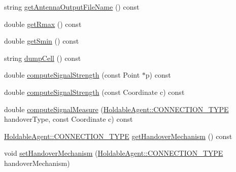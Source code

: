 \begin{DoxyCompactItemize}
\item 
string \mbox{\hyperlink{class_antenna_a7a3919b137b91c1f8f13d620bc7657ed}{get\+Antenna\+Output\+File\+Name}} () const
\item 
double \mbox{\hyperlink{class_antenna_adf33d1b0be85f95c543a31dc1b3159f5}{get\+Rmax}} () const
\item 
double \mbox{\hyperlink{class_antenna_a1955f59f9d3b20ffd8e79f4893bf2e61}{get\+Smin}} () const
\item 
string \mbox{\hyperlink{class_antenna_a8ed18205ff7c675868090e4c80454c2c}{dump\+Cell}} () const
\item 
double \mbox{\hyperlink{class_antenna_a228297a3cb00c11fab97d615b4817656}{compute\+Signal\+Strength}} (const Point $\ast$p) const
\item 
double \mbox{\hyperlink{class_antenna_ac33fe5654d4e3307a4c1c155b0f89128}{compute\+Signal\+Strength}} (const Coordinate c) const
\item 
double \mbox{\hyperlink{class_antenna_a2fab50e7dbe01acec58d7fe89798e9b6}{compute\+Signal\+Measure}} (\mbox{\hyperlink{class_holdable_agent_ae2c334b004d7b9c5a999cf2618e4e518}{Holdable\+Agent\+::\+C\+O\+N\+N\+E\+C\+T\+I\+O\+N\+\_\+\+T\+Y\+PE}} handover\+Type, const Coordinate c) const
\item 
\mbox{\hyperlink{class_holdable_agent_ae2c334b004d7b9c5a999cf2618e4e518}{Holdable\+Agent\+::\+C\+O\+N\+N\+E\+C\+T\+I\+O\+N\+\_\+\+T\+Y\+PE}} \mbox{\hyperlink{class_antenna_a35001fa0ad0e015c275d08ac84d2982b}{get\+Handover\+Mechanism}} () const
\item 
void \mbox{\hyperlink{class_antenna_a08ae04778bc036f108762fa9be818332}{set\+Handover\+Mechanism}} (\mbox{\hyperlink{class_holdable_agent_ae2c334b004d7b9c5a999cf2618e4e518}{Holdable\+Agent\+::\+C\+O\+N\+N\+E\+C\+T\+I\+O\+N\+\_\+\+T\+Y\+PE}} handover\+Mechanism)
\end{DoxyCompactItemize}
